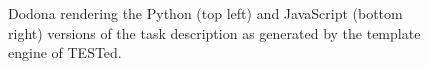 \documentclass[../main]{subfiles}
\begin{document}
\begin{figure}
    \centering
    \caption{Dodona rendering the Python (top left) and JavaScript (bottom right) versions of the task description as generated by the template engine of TESTed.\label{fig:dodona-render-task-description}}
\end{figure}
\end{document}
